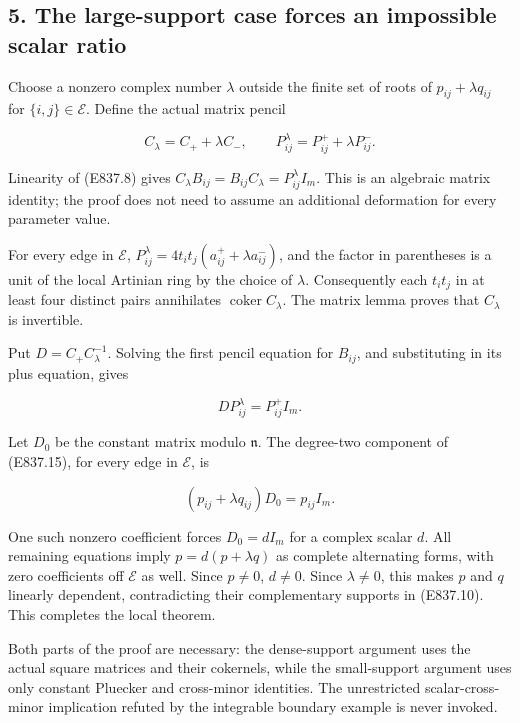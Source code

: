 \subsection{5. The large-support case forces an impossible scalar
ratio}\label{the-large-support-case-forces-an-impossible-scalar-ratio}

Choose a nonzero complex number \(\lambda\) outside the finite set of
roots of \(p_{ij}+\lambda q_{ij}\) for \(\{i,j\}\in\mathcal E\). Define
the actual matrix pencil

\[
 C_\lambda=C_++\lambda C_-,
 \qquad P^\lambda_{ij}=P^+_{ij}+\lambda P^-_{ij}.
 \tag{E837.14}
\]

Linearity of (E837.8) gives
\(C_\lambda B_{ij}=B_{ij}C_\lambda=P^\lambda_{ij}I_m\). This is an
algebraic matrix identity; the proof does not need to assume an
additional deformation for every parameter value.

For every edge in \(\mathcal E\),
\(P^\lambda_{ij}=4t_it_j(a^+_{ij}+\lambda a^-_{ij})\), and the factor in
parentheses is a unit of the local Artinian ring by the choice of
\(\lambda\). Consequently each \(t_it_j\) in at least four distinct
pairs annihilates \(\operatorname{coker}C_\lambda\). The matrix lemma
proves that \(C_\lambda\) is invertible.

Put \(D=C_+C_\lambda^{-1}\). Solving the first pencil equation for
\(B_{ij}\), and substituting in its plus equation, gives

\[
 D P^\lambda_{ij}=P^+_{ij}I_m.
 \tag{E837.15}
\]

Let \(D_0\) be the constant matrix modulo \(\mathfrak n\). The
degree-two component of (E837.15), for every edge in \(\mathcal E\), is

\[
 (p_{ij}+\lambda q_{ij})D_0=p_{ij}I_m.
 \tag{E837.16}
\]

One such nonzero coefficient forces \(D_0=d I_m\) for a complex scalar
\(d\). All remaining equations imply \(p=d(p+\lambda q)\) as complete
alternating forms, with zero coefficients off \(\mathcal E\) as well.
Since \(p\ne0\), \(d\ne0\). Since \(\lambda\ne0\), this makes \(p\) and
\(q\) linearly dependent, contradicting their complementary supports in
(E837.10). This completes the local theorem.

Both parts of the proof are necessary: the dense-support argument uses
the actual square matrices and their cokernels, while the small-support
argument uses only constant Pluecker and cross-minor identities. The
unrestricted scalar-cross-minor implication refuted by the integrable
boundary example is never invoked.

